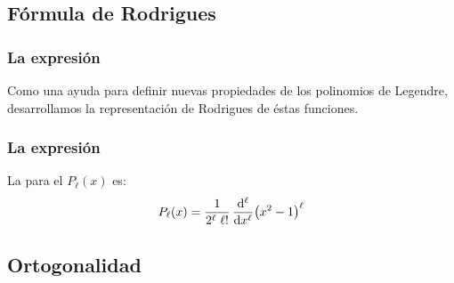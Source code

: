 \documentclass[12pt]{beamer}
\begin{document}
\subsection{Fórmula de Rodrigues}

\begin{frame}
\frametitle{La expresión}
Como una ayuda para definir nuevas propiedades de los polinomios de Legendre, desarrollamos la representación de Rodrigues de éstas funciones.
\end{frame}
\begin{frame}
\frametitle{La expresión}
La  para el $P_{\ell} (x)$ es:
\pause
\begin{align}
P_{\ell} (x) = \dfrac{1}{2^{\ell} \; \ell !} \, \dv[\ell]{x}  (x^{2} - 1)^{\ell}
\label{eq:ecuacion_18_09}
\end{align}
\end{frame}

\subsection{Ortogonalidad}
\end{document}
